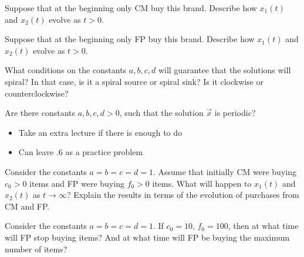 	\begin{parts}
		\item Suppose that at the beginning only CM buy this brand. Describe how $x_1(t)$ and $x_2(t)$ evolve as $t>0$.


		\item Suppose that at the beginning only FP buy this brand. Describe how $x_1(t)$ and $x_2(t)$ evolve as $t>0$.


		\item What conditions on the constants $a,b,c,d$ will guarantee that the solutions will spiral? In that case, is it a spiral source or spiral sink? Is it clockwise or counterclockwise?
		\item Are there constants $a,b,c,d>0$, such that the solution $\vec{x}$ is periodic?
\begin{annotation}
	\begin{goals}
		\begin{itemize}
			\item Take an extra lecture if there is enough to do
			\item Can leave .6 as a practice problem
		\end{itemize}
	\end{goals}
\end{annotation}
		\item Consider the constants $a=b=c=d=1$. Assume that initially CM were buying $c_0>0$ items and FP were buying $f_0>0$ items.
			What will happen to $x_1(t)$ and $x_2(t)$ as $t \to \infty$? Explain the results in terms of the evolution of purchases from CM and FP.
		\item Consider the constants $a=b=c=d=1$.  If $c_0=10$, $f_0=100$, then at what time will FP stop buying items? And at what time will FP be buying the maximum number of items?
	
	\end{parts}




\bookonlynewpage


\hfill

\bookonlynewpage
\standardonlynewpage
